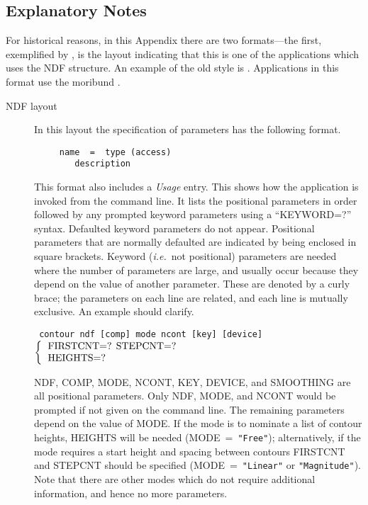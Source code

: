 \documentclass[twoside,11pt,nolof]{starlink}
\begin{document}
\subsection{Explanatory Notes}
For historical reasons, in this Appendix there are two formats---the
first, exemplified by , is the layout indicating
that this is one of the applications which uses the NDF structure. An
example of the old style is .  Applications
in this format use the moribund .

\begin{description}
\item [NDF layout]
In this layout the specification of parameters has the following
format.

\begin{verbatim}
     name  =  type (access)
        description
\end{verbatim}
This format also includes a \emph{Usage\/} entry.  \label{ap:usage}
This shows how the application is invoked from the command line.  It
lists the positional parameters in order followed by any prompted
keyword parameters using a \mbox{``KEYWORD=?''} syntax.  Defaulted
keyword parameters do not appear.  Positional parameters that are
normally defaulted are indicated by being enclosed in square brackets.
Keyword ({\it{i.e.}}\ not positional) parameters are needed where the
number of parameters are large, and usually occur because they depend
on the value of another parameter.  These are denoted by a curly
brace; the parameters on each line are related, and each line is
mutually exclusive.  An example should clarify.
\bigskip

{\tt \hspace*{1.0em}
        contour ndf [comp] mode ncont [key] [device]
        \newline\hspace*{2.5em}
        $\left\{ {\begin{tabular}{l}
                    FIRSTCNT=? STEPCNT=? \\
                    HEIGHTS=?
                   \end{tabular} }
        \right.$
        \newline\hspace*{2.9em}
}
\bigskip

NDF, COMP, MODE, NCONT, KEY, DEVICE, and SMOOTHING are all positional
parameters.  Only NDF, MODE, and NCONT would be prompted if not given
on the command line.  The remaining parameters depend on the value of
MODE.  If the mode is to nominate a list of contour heights, HEIGHTS
will be needed (MODE~=~{\tt "Free"}); alternatively, if the mode requires a
start height and spacing between contours FIRSTCNT and STEPCNT should be
specified (MODE~=~{\tt "Linear"} or {\tt "Magnitude"}).  Note that there
are other modes which do not require additional information, and hence no
more parameters.


\end{description}
\end{document}
